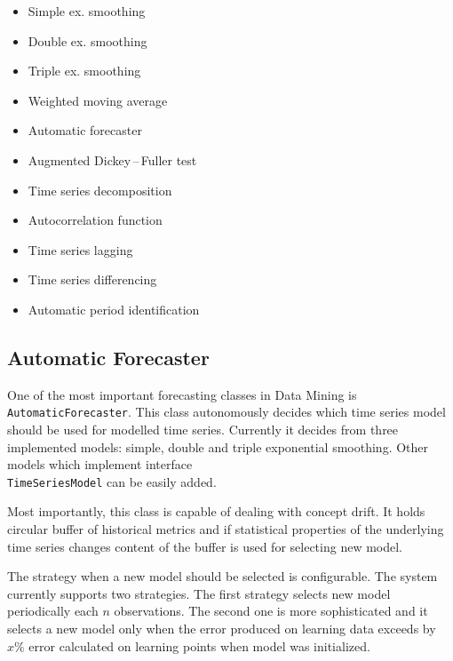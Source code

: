     \begin{multicols}{2}
        \begin{itemize}
            \item Simple ex. smoothing
            \item Double ex. smoothing
            \item Triple ex. smoothing
            \item Weighted moving average
            \item Automatic forecaster
            \item Augmented Dickey\,--\,Fuller test
            \item Time series decomposition
            \item Autocorrelation function
            \item Time series lagging
            \item Time series differencing
            \item Automatic period identification
        \end{itemize}
    \end{multicols}

        \subsection{Automatic Forecaster}
        One of the most important forecasting classes in Data Mining is \\\texttt{AutomaticForecaster}. This class
        autonomously decides which time series model should be used for modelled time series. Currently it decides from
        three implemented models: simple, double and triple exponential smoothing. Other models which implement
        interface \\\texttt{TimeSeriesModel} can be easily added.

        Most importantly, this class is capable of dealing with concept drift. It holds circular buffer of historical
        metrics and if statistical properties of the underlying time series changes content of the buffer is used for
        selecting new model.

        The strategy when a new model should be selected is configurable. The system currently
        supports two strategies. The first strategy selects new model periodically each $n$ observations.
        The second one is more sophisticated and it selects a new model only when the error produced on learning data
        exceeds by $x\%$ error calculated on learning points when model was initialized.

